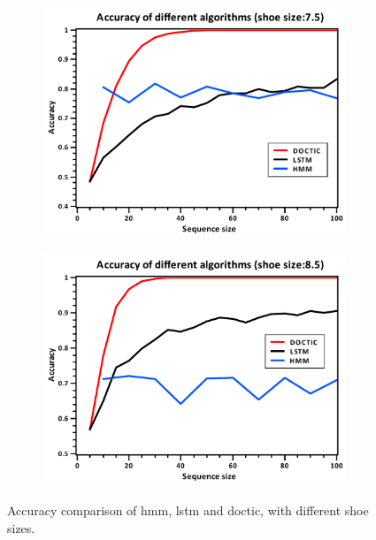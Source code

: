 \documentclass[review]{vgtc}                 %
\begin{document}
\begin{figure}[!htp]
\begin{subfigure}{0.24\textwidth}
		\includegraphics[width=\linewidth]{figs/accuracy_75.pdf}
		\caption{}
		\label{fig:timecost_cumulative}
	\end{subfigure}
	\begin{subfigure}{0.24\textwidth}
		\includegraphics[width=\linewidth]{figs/accuracy_85.pdf}
		\caption{}
		\label{fig:accuracy_cumulative}
	\end{subfigure}	
	\caption{Accuracy comparison of \acs{hmm}, \acs{lstm} and \acs{doctic}, with different shoe sizes.}
	\label{fig:doctic}
\end{figure}

\end{document}
